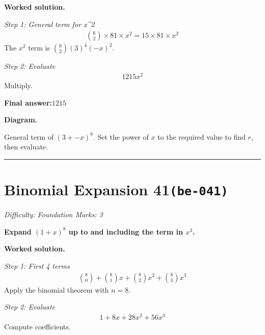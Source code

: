 \documentclass[11pt]{article}
\newcommand{\question}[1]{\par\medskip\noindent\textbf{#1}\par}
\begin{document}
\textbf{Worked solution.}

\textit{Step 1: General term for x\textasciicircum 2}
\[\begin{gathered}
\binom{6}{2} \times 81 \times x^2 = 15 \times 81 \times x^2
\end{gathered}\]
The \( x^2 \) term is \( \binom{6}{2}(3)^4(-x)^2 \).

\textit{Step 2: Evaluate}
\[\begin{gathered}
1215x^2
\end{gathered}\]
Multiply.

\begin{answerbox}
\textbf{Final answer:}\quad \(\displaystyle 1215\)
\end{answerbox}
\textbf{Diagram.}

\begin{center}
\end{center}
\small General term of $\left(3+-x\right)^{6}$. Set the power of $x$ to the required value to find $r$, then evaluate.\normalsize

\medskip\hrule

\section*{Binomial Expansion 41\quad\small\texttt{(be-041)}}
\textit{Difficulty: Foundation \quad\textbar\quad Marks: 3}

\question{Expand \( (1 + x)^8 \) up to and including the term in \( x^3 \).}

\textbf{Worked solution.}

\textit{Step 1: First 4 terms}
\[\begin{gathered}
\binom{8}{0} + \binom{8}{1}x + \binom{8}{2}x^2 + \binom{8}{3}x^3
\end{gathered}\]
Apply the binomial theorem with \( n = 8 \).

\textit{Step 2: Evaluate}
\[\begin{gathered}
1 + 8x + 28x^2 + 56x^3
\end{gathered}\]
Compute coefficients.
\end{document}
